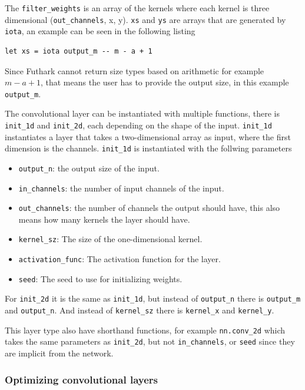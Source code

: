The \texttt{filter\_weights} is an array of the kernels where each kernel is three dimensional (\texttt{out\_channels}, x, y).
\texttt{xs} and \texttt{ys} are arrays that are generated by \texttt{iota}, an example can be seen in the following listing

\begin{lstlisting}
let xs = iota output_m -- m - a + 1
\end{lstlisting}

Since Futhark cannot return size types based on arithmetic for example $m - a + 1$, that means the user has to provide the output size, in this example \texttt{output\_m}.

The convolutional layer can be instantiated with multiple functions, there is \texttt{init\_1d} and \texttt{init\_2d}, each depending on the shape of the input.
\texttt{init\_1d} instantiates a layer that takes a two-dimensional array as input, where the first dimension is the channels.
\texttt{init\_1d} is instantiated with the follwing parameters
\begin{itemize}
    \item \texttt{output\_n}: the output size of the input.
    \item \texttt{in\_channels}: the number of input channels of the input.
    \item \texttt{out\_channels}: the number of channels the output should have, this also means how many kernels the layer should have.
    \item \texttt{kernel\_sz}: The size of the one-dimensional kernel.
    \item \texttt{activation\_func}: The activation function for the layer.
    \item \texttt{seed}: The seed to use for initializing weights.
\end{itemize}
For \texttt{init\_2d} it is the same as \texttt{init\_1d}, but instead of \texttt{output\_n} there is \texttt{output\_m} and \texttt{output\_n}. And instead of \texttt{kernel\_sz} there is \texttt{kernel\_x} and \texttt{kernel\_y}.

This layer type also have shorthand functions, for example \texttt{nn.conv\_2d} which takes the same parameters as \texttt{init\_2d}, but not \texttt{in\_channels}, or \texttt{seed} since they are implicit from the network.

\subsubsection*{Optimizing convolutional layers}

